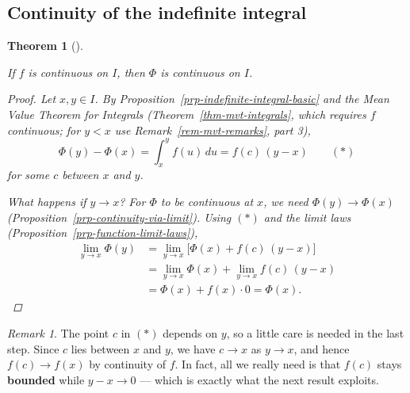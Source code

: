 \documentclass[
  letterpaper,
  DIV=11,
  numbers=noendperiod]{scrreprt}
\theoremstyle{plain}
\theoremstyle{plain}
\theoremstyle{definition}
\theoremstyle{definition}
\theoremstyle{definition}
\theoremstyle{plain}
\newtheorem{theorem}{Theorem}[chapter]
\theoremstyle{plain}
\theoremstyle{remark}
\newtheorem{refremark}{Remark}[chapter]
\begin{document}
\subsection{Continuity of the indefinite
integral}\label{continuity-of-the-indefinite-integral}

\begin{theorem}[]\protect\hypertarget{thm-indefinite-integral-continuous}{}\label{thm-indefinite-integral-continuous}

\hfill\break
If \(f\) is continuous on \(I\), then \(\Phi\) is continuous on \(I\).

\begin{proof}
Let \(x, y\in I\). By Proposition~\ref{prp-indefinite-integral-basic}
and the Mean Value Theorem for Integrals
(Theorem~\ref{thm-mvt-integrals}, which requires \(f\) continuous; for
\(y<x\) use Remark~\ref{rem-mvt-remarks}, part 3), \[
\Phi(y) - \Phi(x) = \int_x^y f(u)\,du = f(c)\,(y-x) \qquad (\ast)
\] for some \(c\) between \(x\) and \(y\).

What happens if \(y\to x\)? For \(\Phi\) to be continuous at \(x\), we
need \(\Phi(y)\to\Phi(x)\) (Proposition~\ref{prp-continuity-via-limit}).
Using \((\ast)\) and the limit laws
(Proposition~\ref{prp-function-limit-laws}), \[
\begin{aligned}
\lim_{y\to x}\Phi(y)
  &= \lim_{y\to x}\bigl[\Phi(x) + f(c)\,(y-x)\bigr] \\
  &= \lim_{y\to x}\Phi(x) + \lim_{y\to x} f(c)\,(y-x) \\
  &= \Phi(x) + f(x)\cdot 0 = \Phi(x).
\end{aligned}
\]
\end{proof}

\end{theorem}

\begin{refremark}
The point \(c\) in \((\ast)\) depends on \(y\), so a little care is
needed in the last step. Since \(c\) lies between \(x\) and \(y\), we
have \(c\to x\) as \(y\to x\), and hence \(f(c)\to f(x)\) by continuity
of \(f\). In fact, all we really need is that \(f(c)\) stays
\textbf{bounded} while \(y-x\to 0\) --- which is exactly what the next
result exploits.

\label{rem-c-depends-on-y}

\end{refremark}
\end{document}
